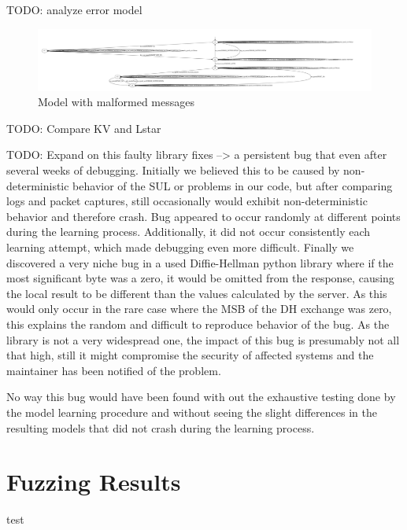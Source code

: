 TODO: analyze error model

\begin{figure}
	\centering
	\includegraphics[width=\linewidth]{images/WithFilterWithErrors}
	\caption{Model with malformed messages}
	\label{fig:withfilterwitherrors}
\end{figure}


TODO: Compare KV and Lstar

TODO: Expand on this
faulty library fixes --> a persistent bug that even after several weeks of debugging. Initially we believed this to be caused by non-deterministic behavior of the SUL or problems in our code, but after comparing logs and packet captures, still occasionally would exhibit non-deterministic behavior and therefore crash. Bug appeared to occur randomly at different points during the learning process. Additionally, it did not occur consistently each learning attempt, which made debugging even more difficult. Finally we discovered a very niche bug in a used Diffie-Hellman python library where if the most significant byte was a zero, it would be omitted from the response, causing the local result to be different than the values calculated by the server. As this would only occur in the rare case where the MSB of the DH exchange was zero, this explains the random and difficult to reproduce behavior of the bug. As the library is not a very widespread one, the impact of this bug is presumably not all that high, still it might compromise the security of affected systems and the maintainer has been notified of the problem.

No way this bug would have been found with out the exhaustive testing done by the model learning procedure and without seeing the slight differences in the resulting models that did not crash during the learning process.
\section{Fuzzing Results} \label{subsec:fuzzresults}
test
